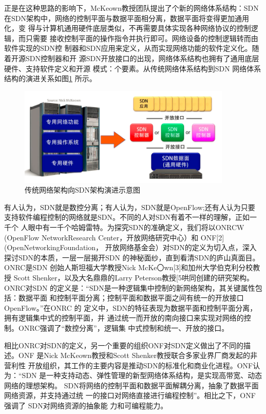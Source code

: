 正是在这种思路的影响下，McKeown教授团队提出了个新的网络体系结构：SDN 在SDN架构中，网络的控制平面与数据平面相分离，数据平面将变得更加通用化，变 得与计算机通用硬件底层类似，不再需要具体实现各种网络协议的控制逻辑，而只需要 接收控制平面的操作指令并执行即可。网络设备的控制逻辑转而由软件实现的SDN控 制器和SDN应用来定义，从而实现网络功能的软件定义化。随着开源SDN控制器和开 源SDN开放接口的出现，网络体系结构也拥有了通用底层硬件、支持软件定义和开源 模式：个要素。从传统网络体系结构到SDN 网络体系结构的演进关系如图\ref{fig:SchematicDiagram4EvolutionFromTraditionalNetworkArchitecture2SDNArchitecture} 所示。
\begin{figure}[htbp]
\centering
\includegraphics[width=4.0in]{figures/SchematicDiagram4EvolutionFromTraditionalNetworkArchitecture2SDNArchitecture}
  \caption{传统网络架构向SDN架构演进示意图}
  \label{fig:SchematicDiagram4EvolutionFromTraditionalNetworkArchitecture2SDNArchitecture}
\end{figure}



有人认为，SDN就是数控分离；有人认为，SDN就是OpenFlow;还有人认为只要 支持软件编程控制的网络就是SDN。不同的人对SDN有着不一样的理解，正如一千个 人眼中有一千个哈姆雷特。为探究SDN的准确定义，我们将以ONRCW (OpenFlow NetworkResearch Center，开放网络研究中心）和 ONF[2] (OpenNetworkingFoundation， 开放网络基金会）对SDN的定义为切入点，深入探讨SDN的本质，一层一层揭开SDN 的神秘面纱，直到看清SDN的庐山真面目。ONRC是SDN 创始人斯坦福大学教授Nick McKe〇wn[3]和加州大学伯克利分校教授 Scott Shenker，以及大名鼎鼎的Larry Peterson教授[5哄同创建的研究架构。ONRC对SDN 的定义是：“SDN是一种逻辑集中控制的新网络架构，其关键属性包括：数据平面 和控制平面分离；控制平面和数据平面之间有统一的开放接口 OpenFlow。”在ONRC 的 定义中，SDN的特征表现为数据平面和控制平面分离，拥有逻辑集中式的控制平面，并 通过统一而开放的南向接口来实现对网络的控制。ONRC强调了“数控分离”，逻辑集 中式控制和统一、开放的接口。

相比ONRC对SDN的定义，另一个重要的组织ONF对SDN定义做出了不同的描 述。ONF 是Nick McKeown教授和Scott Shenker教授联合多家业界厂商发起的非营利性 开放组织，其工作的主要内容是推动SDN的标准化和商业化进程。ONF认为：“SDN 是一种支持动态、弹性管理的新型网络体系结构，是实现高带宽、动态网络的理想架构。 SDN将网络的控制平面和数据平面解耦分离，抽象了数据平面网络资源，并支持通过统 一的接口对网络直接进行编程控制”。相比之下，ONF 强调了 SDN对网络资源的抽象能 力和可编程能力。

